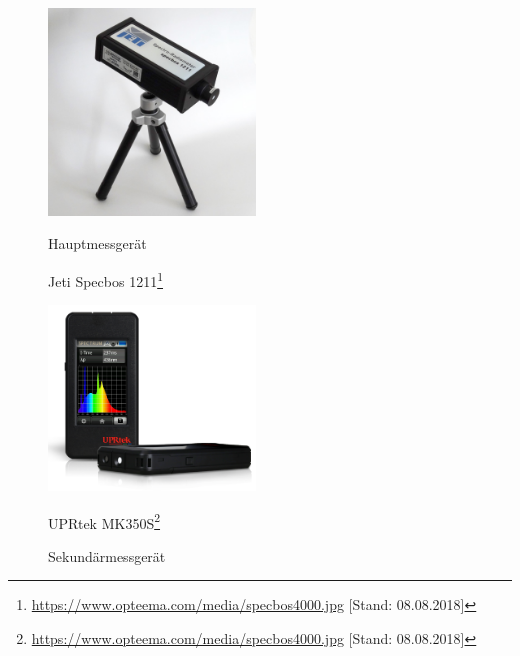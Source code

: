 \begin{figure}
\begin{minipage}[hbt]{0.49\textwidth}
	\centering
	\includegraphics[width=0.49\textwidth]{bilder/jeti}
	\label{b_jeti}
	\setcounter{mpfootnote}{\value{footnote}}
      \renewcommand{\thempfootnote}{\arabic{mpfootnote}}
       \caption{Hauptmessgerät}
      Jeti Specbos 1211\footnote{\url{https://www.opteema.com/media/specbos4000.jpg} [Stand: 08.08.2018]}
        \setcounter{footnote}{\value{mpfootnote}}
\end{minipage}
\hfill
\begin{minipage}[hbt]{0.49\textwidth}
	\centering
	\includegraphics[width=0.49\textwidth]{bilder/mk350s}
	\label{b_mk350s}
	\setcounter{mpfootnote}{\value{footnote}}
      \renewcommand{\thempfootnote}{\arabic{mpfootnote}}
      \caption{Sekundärmessgerät}
      UPRtek MK350S\footnote{\url{https://www.opteema.com/media/specbos4000.jpg} [Stand: 08.08.2018]}
            \setcounter{footnote}{\value{mpfootnote}}
\end{minipage}
\end{figure}

